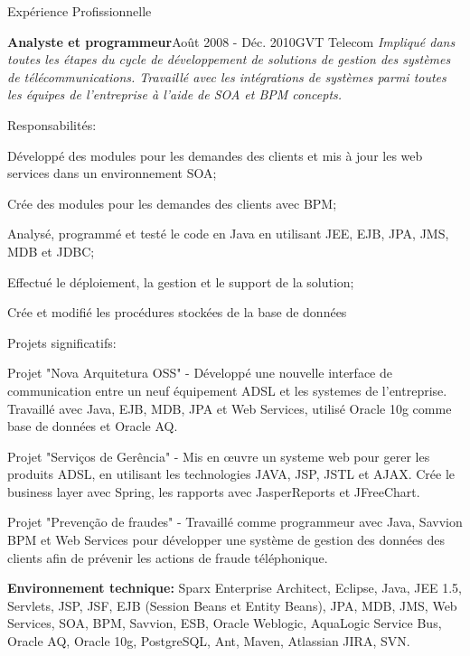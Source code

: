 \documentclass{resume}
\begin{document}
\begin{rSection}{Expérience Profissionnelle}
\begin{rSubsection}{\fontsize{12}{14}\selectfont \bf Analyste et programmeur}{\fontsize{12}{14}\selectfont Août 2008 - Déc. 2010}{\fontsize{12}{14}\selectfont GVT Telecom}{}
      \textit{Impliqué dans toutes les étapes du cycle de développement de solutions de gestion des systèmes de télécommunications. Travaillé avec les intégrations de systèmes parmi toutes les équipes de l'entreprise à l'aide de SOA et BPM concepts.}
    
    \end{rSubsection}

      \begin{rSubsection}{\fontsize{9}{10}\selectfont Responsabilités:}{}{}{}
        \item Développé des modules pour les demandes des clients et mis à jour les web services dans un environnement SOA;
        \item Crée des modules pour les demandes des clients avec BPM;
        \item Analysé, programmé et testé le code en Java en utilisant JEE, EJB, JPA, JMS, MDB et JDBC;
        \item Effectué le déploiement, la gestion et le support de la solution;
        \item Crée et modifié les procédures stockées de la base de données
      \end{rSubsection}

      \begin{rSubsection}{\fontsize{9}{10}\selectfont Projets significatifs:}{}{}{}
        \item Projet "Nova Arquitetura OSS" - Développé une nouvelle interface de communication entre un neuf équipement ADSL et les systemes de l'entreprise. Travaillé avec Java, EJB, MDB, JPA et Web Services, utilisé Oracle 10g comme base de données et Oracle AQ.
        \item Projet "Serviços de Gerência" - Mis en œuvre un systeme web pour gerer les produits ADSL, en utilisant les technologies JAVA, JSP, JSTL et AJAX. Crée le business layer avec Spring, les rapports avec JasperReports et JFreeChart.
        \item Projet "Prevenção de fraudes" - Travaillé comme programmeur avec Java, Savvion BPM et Web Services pour développer une système de gestion des données des clients afin de prévenir les actions de fraude téléphonique.
      \end{rSubsection}
    
      {\fontsize{8}{9}\selectfont \textbf{Environnement technique:} Sparx Enterprise Architect, Eclipse, Java, JEE 1.5, Servlets, JSP, JSF, EJB (Session Beans et Entity Beans), JPA, MDB, JMS, Web Services, SOA, BPM, Savvion, ESB, Oracle Weblogic, AquaLogic Service Bus, Oracle AQ, Oracle 10g, PostgreSQL, Ant, Maven, Atlassian JIRA, SVN.} \\
    


\end{rSection}
\end{document}
